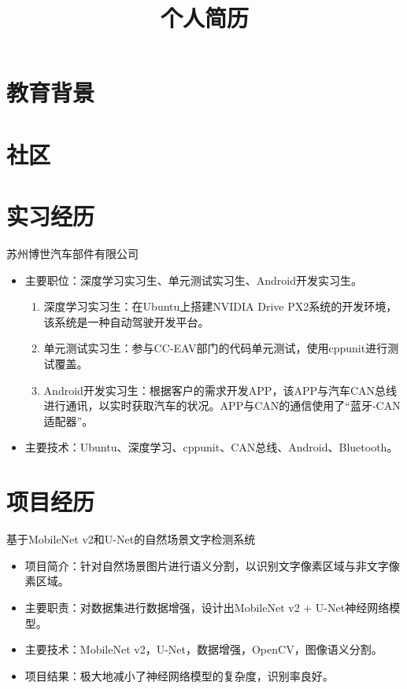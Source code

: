 \documentclass[11pt, a4paper]{moderncv}
\title{个人简历}
\begin{document}
	\maketitle
	
	\section{教育背景}

	\section{社区}
	
	\section{实习经历}
	{苏州博世汽车部件有限公司}
	{}{}{}{
		\begin{itemize}
			\item 主要职位：深度学习实习生、单元测试实习生、Android开发实习生。
			\begin{enumerate}
				\item 深度学习实习生：在Ubuntu上搭建NVIDIA Drive PX2系统的开发环境，该系统是一种自动驾驶开发平台。
				\item 单元测试实习生：参与CC-EAV部门的代码单元测试，使用cppunit进行测试覆盖。
				\item Android开发实习生：根据客户的需求开发APP，该APP与汽车CAN总线进行通讯，以实时获取汽车的状况。APP与CAN的通信使用了“蓝牙-CAN适配器”。
			\end{enumerate}
			\item 主要技术：Ubuntu、深度学习、cppunit、CAN总线、Android、Bluetooth。
	\end{itemize}}{}	 
	
	\section{项目经历}
	{基于MobileNet v2和U-Net的自然场景文字检测系统}
	{}{}{}{
		\begin{itemize}
			\item 项目简介：针对自然场景图片进行语义分割，以识别文字像素区域与非文字像素区域。
			\item 主要职责：对数据集进行数据增强，设计出MobileNet v2 + U-Net神经网络模型。
			\item 主要技术：MobileNet v2，U-Net，数据增强，OpenCV，图像语义分割。
			\item 项目结果：极大地减小了神经网络模型的复杂度，识别率良好。
		\end{itemize}}{}	  
\end{document}
